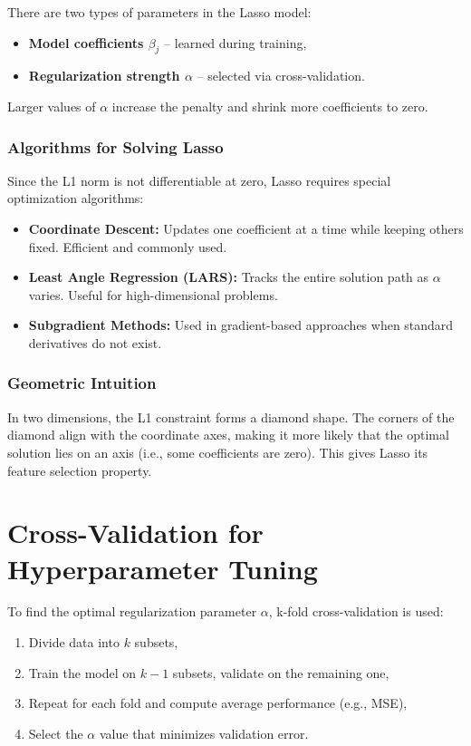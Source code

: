 \documentclass[12pt, a4paper]{report}
\begin{document}
There are two types of parameters in the Lasso model:
\begin{itemize}
    \item \textbf{Model coefficients \( \beta_j \)} – learned during training,
    \item \textbf{Regularization strength \( \alpha \)} – selected via cross-validation.
\end{itemize}

Larger values of \( \alpha \) increase the penalty and shrink more coefficients to zero.

\subsubsection*{Algorithms for Solving Lasso}

Since the L1 norm is not differentiable at zero, Lasso requires special optimization algorithms:

\begin{itemize}
    \item \textbf{Coordinate Descent:} Updates one coefficient at a time while keeping others fixed. Efficient and commonly used.
    \item \textbf{Least Angle Regression (LARS):} Tracks the entire solution path as \( \alpha \) varies. Useful for high-dimensional problems.
    \item \textbf{Subgradient Methods:} Used in gradient-based approaches when standard derivatives do not exist.
\end{itemize}

\subsubsection*{Geometric Intuition}

In two dimensions, the L1 constraint forms a diamond shape. The corners of the diamond align with the coordinate axes, making it more likely that the optimal solution lies on an axis (i.e., some coefficients are zero). This gives Lasso its feature selection property.

\section{ Cross-Validation for Hyperparameter Tuning}

To find the optimal regularization parameter \( \alpha \), k-fold cross-validation is used:

\begin{enumerate}
    \item Divide data into \( k \) subsets,
    \item Train the model on \( k-1 \) subsets, validate on the remaining one,
    \item Repeat for each fold and compute average performance (e.g., MSE),
    \item Select the \( \alpha \) value that minimizes validation error.
\end{enumerate}
\end{document}
